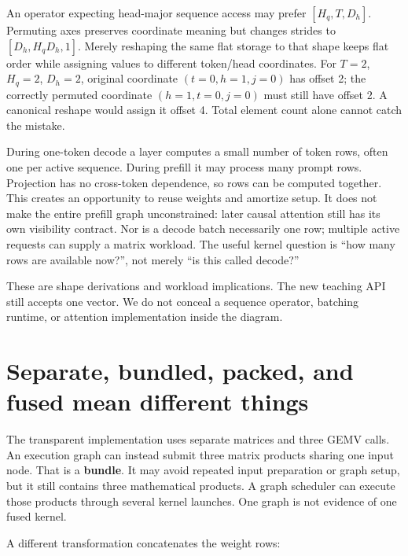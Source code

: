 An operator expecting head-major sequence access may prefer
\([H_q,T,D_h]\). Permuting axes preserves coordinate meaning but changes
strides to \([D_h,H_qD_h,1]\). Merely reshaping the same flat storage to
that shape keeps flat order while assigning values to different
token/head coordinates. For \(T=2\), \(H_q=2\), \(D_h=2\), original
coordinate \((t=0,h=1,j=0)\) has offset 2; the correctly permuted
coordinate \((h=1,t=0,j=0)\) must still have offset 2. A canonical
reshape would assign it offset 4. Total element count alone cannot catch
the mistake.

During one-token decode a layer computes a small number of token rows,
often one per active sequence. During prefill it may process many prompt
rows. Projection has no cross-token dependence, so rows can be computed
together. This creates an opportunity to reuse weights and amortize
setup. It does not make the entire prefill graph unconstrained: later
causal attention still has its own visibility contract. Nor is a decode
batch necessarily one row; multiple active requests can supply a matrix
workload. The useful kernel question is ``how many rows are available
now?'', not merely ``is this called decode?''

These are shape derivations and workload implications. The new teaching
API still accepts one vector. We do not conceal a sequence operator,
batching runtime, or attention implementation inside the diagram.

\section{Separate, bundled, packed, and fused mean different
things}\label{separate-bundled-packed-and-fused-mean-different-things}


The transparent implementation uses separate matrices and three GEMV
calls. An execution graph can instead submit three matrix products
sharing one input node. That is a \textbf{bundle}. It may avoid repeated
input preparation or graph setup, but it still contains three
mathematical products. A graph scheduler can execute those products
through several kernel launches. One graph is not evidence of one fused
kernel.

A different transformation concatenates the weight rows:

